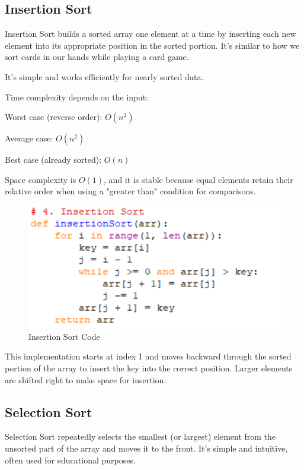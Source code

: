 \documentclass[sigconf]{acmart}
\begin{document}
\subsection{Insertion Sort}
Insertion Sort builds a sorted array one element at a time by inserting each new element into its appropriate position in the sorted portion. It's similar to how we sort cards in our hands while playing a card game.

It's simple and works efficiently for nearly sorted data.

Time complexity depends on the input:

Worst case (reverse order): $O(n^2)$

Average case: $O(n^2)$

Best case (already sorted): $O(n)$

Space complexity is $O(1)$, and it is stable because equal elements retain their relative order when using a "greater than" condition for comparisons.

\begin{figure}[H]
\centering
\includegraphics[width=0.85\linewidth]{figures/004.pdf}
\vspace{-0.3cm}
\caption{Insertion Sort Code}  
\vspace{-0.35cm}
\label{fig:proportion}
\end{figure}

This implementation starts at index 1 and moves backward through the sorted portion of the array to insert the key into the correct position. Larger elements are shifted right to make space for insertion.

\subsection{Selection Sort}
Selection Sort repeatedly selects the smallest (or largest) element from the unsorted part of the array and moves it to the front. It's simple and intuitive, often used for educational purposes.
\end{document}
